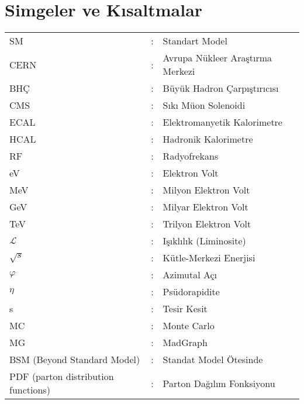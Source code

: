 \chapter*{Simgeler ve Kısaltmalar}

\begin{tabular}{lrl}

SM & : & Standart Model \\
CERN & : & Avrupa Nükleer Araştırma Merkezi \\
BHÇ & : & Büyük Hadron Çarpıştırıcısı \\
CMS & : & Sıkı Müon Solenoidi \\
ECAL & : & Elektromanyetik Kalorimetre \\
HCAL & : & Hadronik Kalorimetre \\
RF & : & Radyofrekans \\
eV & : & Elektron Volt \\
MeV & : & Milyon Elektron Volt \\
GeV & : & Milyar Elektron Volt  \\
TeV & : & Trilyon Elektron Volt  \\
$\mathcal{L}$ & : & Işıklılık (Liminosite) \\
$\sqrt{s}$ & : & Kütle-Merkezi Enerjisi  \\
$\varphi$ & : & Azimutal Açı \\
$\eta$ & : & Psüdorapidite \\
s & : & Tesir Kesit \\
MC & : & Monte Carlo \\
MG & : & MadGraph \\
BSM (Beyond Standard Model) & : & Standat Model Ötesinde \\
PDF (parton distribution functions) & : & Parton Dağılım Fonksiyonu\\



\end{tabular}
 